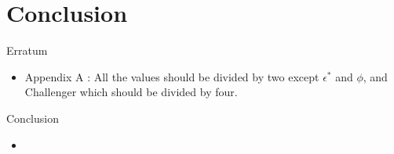 \section{Conclusion}

\begin{frame}{Erratum}
	\begin{itemize}
		\item Appendix A : All the values should be divided by two except $\epsilon^*$ and $\phi$, and Challenger which should be divided by four.
	\end{itemize}
\end{frame}

\begin{frame}{Conclusion}
	\begin{itemize}
		\item 
	\end{itemize}
\end{frame}